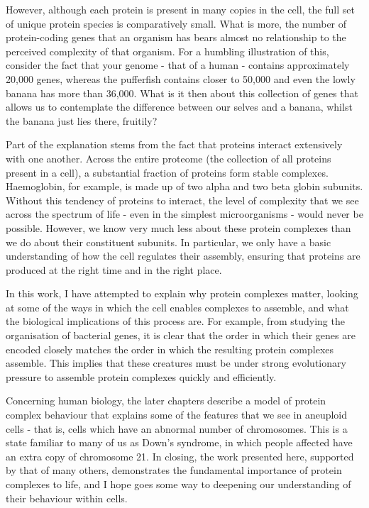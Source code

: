 \documentclass[a4paper,11pt,twoside,openright]{scrbook}
\begin{document}
However, although each protein is present in many copies in the cell, the full set of unique protein species is comparatively small. What is more, the number of protein-coding genes that an organism has bears almost no relationship to the perceived complexity of that organism. For a humbling illustration of this, consider the fact that your genome - that of a human - contains approximately 20,000 genes, whereas the pufferfish contains closer to 50,000 and even the lowly banana has more than 36,000. What is it then about this collection of genes that allows us to contemplate the difference between our selves and a banana, whilst the banana just lies there, fruitily?

Part of the explanation stems from the fact that proteins interact extensively with one another. Across the entire proteome (the collection of all proteins present in a cell), a substantial fraction of proteins form stable complexes. Haemoglobin, for example, is made up of two alpha and two beta globin subunits. Without this tendency of proteins to interact, the level of complexity that we see across the spectrum of life - even in the simplest microorganisms - would never be possible. However, we know very much less about these protein complexes than we do about their constituent subunits. In particular, we only have a basic understanding of how the cell regulates their assembly, ensuring that proteins are produced at the right time and in the right place.

In this work, I have attempted to explain why protein complexes matter, looking at some of the ways in which the cell enables complexes to assemble, and what the biological implications of this process are. For example, from studying the organisation of bacterial genes, it is clear that the order in which their genes are encoded closely matches the order in which the resulting protein complexes assemble. This implies that these creatures must be under strong evolutionary pressure to assemble protein complexes quickly and efficiently.

Concerning human biology, the later chapters describe a model of protein complex behaviour that explains some of the features that we see in aneuploid cells - that is, cells which have an abnormal number of chromosomes. This is a state familiar to many of us as Down's syndrome, in which people affected have an extra copy of chromosome 21. In closing, the work presented here, supported by that of many others, demonstrates the fundamental importance of protein complexes to life, and I hope goes some way to deepening our understanding of their behaviour within cells.
\end{document}
